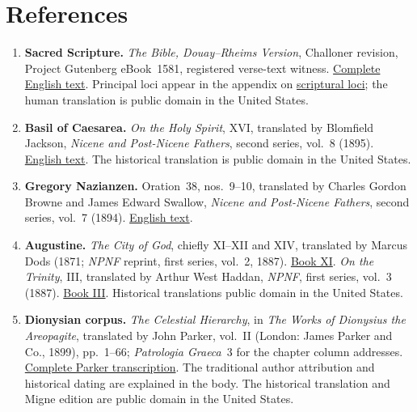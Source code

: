 \section*{References}

\begin{enumerate}[leftmargin=1.7em,itemsep=0.5em]
\item \textbf{Sacred Scripture.} \emph{The Bible, Douay--Rheims Version},
Challoner revision, Project Gutenberg eBook~1581, registered verse-text
witness. \href{https://www.gutenberg.org/ebooks/1581}{Complete English text}.
Principal loci appear in the appendix on \hyperref[app:scripture]{scriptural loci}; the human
translation is public domain in the United States.

\item \textbf{Basil of Caesarea.} \emph{On the Holy Spirit}, XVI,
translated by Blomfield Jackson, \emph{Nicene and Post-Nicene Fathers},
second series, vol.~8 (1895).
\href{https://www.newadvent.org/fathers/3203.htm}{English text}.
The historical translation is public domain in the United States.

\item \textbf{Gregory Nazianzen.} Oration~38, nos.~9--10,
translated by Charles Gordon Browne and James Edward Swallow,
\emph{Nicene and Post-Nicene Fathers}, second series, vol.~7 (1894).
\href{https://www.newadvent.org/fathers/310238.htm}{English text}.

\item \textbf{Augustine.} \emph{The City of God}, chiefly XI--XII and XIV,
translated by Marcus Dods (1871; \emph{NPNF} reprint, first series,
vol.~2, 1887).
\href{https://www.newadvent.org/fathers/120111.htm}{Book XI}.
\emph{On the Trinity}, III, translated by Arthur West Haddan,
\emph{NPNF}, first series, vol.~3 (1887).
\href{https://www.newadvent.org/fathers/130103.htm}{Book III}.
Historical translations public domain in the United States.

\item \textbf{Dionysian corpus.} \emph{The Celestial Hierarchy}, in
\emph{The Works of Dionysius the Areopagite}, translated by John Parker,
vol.~II (London: James Parker and Co., 1899), pp.~1--66;
\emph{Patrologia Graeca}~3 for the chapter column addresses.
\href{https://www.tertullian.org/fathers/areopagite_13_heavenly_hierarchy.htm}{Complete
Parker transcription}. The traditional author attribution and historical
dating are explained in the body. The historical translation and Migne
edition are public domain in the United States.


\end{enumerate}
